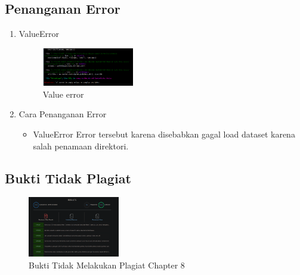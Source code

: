 \subsection{Penanganan Error}
\begin{enumerate}
    \item ValueError
    \begin{figure}[H]
		\includegraphics[width=4cm]{figures/1174027/error/8_value.png}
		\centering
		\caption{Value error}
    \end{figure}
    \item Cara Penanganan Error
    \begin{itemize}
        \item ValueError
        \hfill\break
		Error tersebut karena disebabkan gagal load dataset karena salah penamaan direktori.
    \end{itemize}
\end{enumerate}
\subsection{Bukti Tidak Plagiat}
\begin{figure}[H]
    \includegraphics[width=4cm]{figures/1174027/bukti/8.png}
    \centering
    \caption{Bukti Tidak Melakukan Plagiat Chapter 8}
\end{figure}
